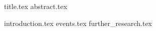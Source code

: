 \documentclass[11pt]{llncs}
\begin{document}
{title.tex}
\thispagestyle{plain}
{abstract.tex}

{introduction.tex}
{events.tex}
{further_research.tex}



\end{document}

